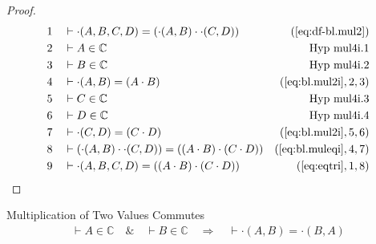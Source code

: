 \begin{proof}
\begin{align}
  1 &&  & \vdash \cdot( A , B , C , D ) = ( \cdot( A , B ) \cdot \cdot( C , D ) )&(\mbox{\ref{eq:df-bl.mul2}})\notag
  \\ 2 &&  & \vdash A \in \mathbb{C}&\text{Hyp~mul4i.1}\notag%
  \\ 3 &&  & \vdash B \in \mathbb{C}&\text{Hyp~mul4i.2}\notag%
  \\ 4 &&  & \vdash \cdot( A , B ) = ( A \cdot B )&(\mbox{\ref{eq:bl.mul2i}},2,3)\notag
  \\ 5 &&  & \vdash C \in \mathbb{C}&\text{Hyp~mul4i.3}\notag%
  \\ 6 &&  & \vdash D \in \mathbb{C}&\text{Hyp~mul4i.4}\notag%
  \\ 7 &&  & \vdash \cdot( C , D ) = ( C \cdot D )&(\mbox{\ref{eq:bl.mul2i}},5,6)\notag
  \\ 8 &&  & \vdash ( \cdot( A , B ) \cdot \cdot( C , D ) ) = ( ( A \cdot B ) \cdot ( C \cdot D ) )&(\mbox{\ref{eq:bl.muleqi}},4,7)\notag
  \\ 9 &&  & \vdash \cdot( A , B , C , D ) = ( ( A \cdot B ) \cdot ( C \cdot D ) )&(\mbox{\ref{eq:eqtri}},1,8)\notag
\end{align}
\end{proof}

\begin{lemma} Multiplication of Two Values Commutes
\begin{align}
\vdash A \in \mathbb{C}\quad\&\quad \vdash B \in
    \mathbb{C}\quad\Rightarrow\quad \vdash \cdot( A , B ) = \cdot( B , A
    )\label{eq:bl.mulcom2}\tag{bl.mulcom2}
\end{align}
\end{lemma}


